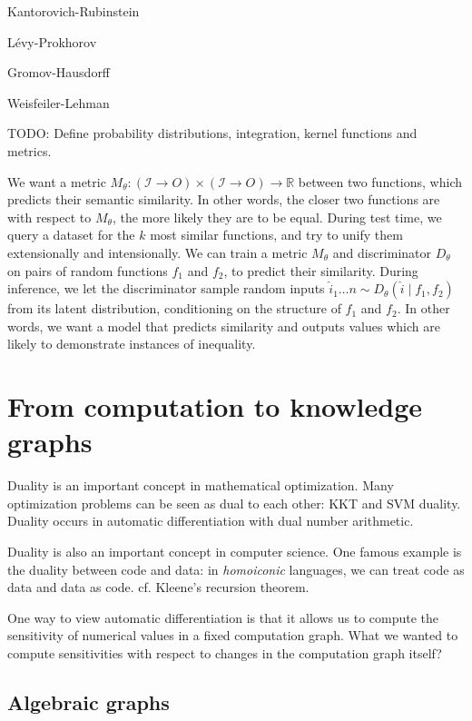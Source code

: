 \documentclass[11pt]{article}
\begin{document}
    Kantorovich-Rubinstein

    L\'evy-Prokhorov

    Gromov-Hausdorff

    Weisfeiler-Lehman

    TODO: Define probability distributions, integration, kernel functions and metrics.

    We want a metric $M_\theta: (\mathcal{I}\rightarrow{O}) \times (\mathcal{I}\rightarrow{O})\rightarrow \mathbb{R}$ between two functions, which predicts their semantic similarity. In other words, the closer two functions are with respect to $M_\theta$, the more likely they are to be equal. During test time, we query a dataset for the $k$ most similar functions, and try to unify them extensionally and intensionally. We can train a metric $M_\theta$ and discriminator $D_\theta$ on pairs of random functions $f_1$ and $f_2$, to predict their similarity. During inference, we let the discriminator sample random inputs $\hat i_1 \ldots n \sim D_\theta(\hat i \mid f_1, f_2)$ from its latent distribution, conditioning on the structure of $f_1$ and $f_2$. In other words, we want a model that predicts similarity and outputs values which are likely to demonstrate instances of inequality.

    \pagebreak


    \section{From computation to knowledge graphs}\label{sec:graphs}


    Duality is an important concept in mathematical optimization. Many optimization problems can be seen as dual to each other: KKT and SVM duality. Duality occurs in automatic differentiation with dual number arithmetic.

    Duality is also an important concept in computer science. One famous example is the duality between code and data: in \textit{homoiconic} languages, we can treat code as data and data as code. cf. Kleene's recursion theorem.

    One way to view automatic differentiation is that it allows us to compute the sensitivity of numerical values in a fixed computation graph. What we wanted to compute sensitivities with respect to changes in the computation graph itself?

    \subsection{Algebraic graphs}\label{subsec:algebraic-graphs}
\end{document}
